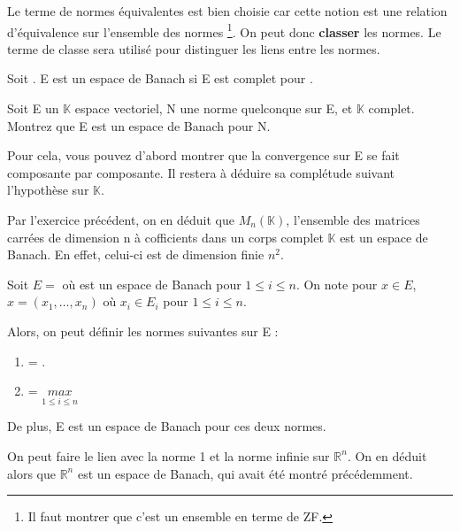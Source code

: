 Le terme de normes équivalentes est bien choisie car cette notion est une
relation d'équivalence sur l'ensemble des normes \footnote{Il faut montrer que
c'est un ensemble en terme de ZF.}.
On peut donc \textbf{classer} les normes. Le terme de classe sera utilisé pour
distinguer les liens entre les normes.

\begin{definition}
	Soit . E est un espace de Banach si E est
	complet pour .
\end{definition}

\begin{exercice}
	Soit E un $\mathbb{K}$ espace vectoriel, N une norme quelconque sur E, et
	$\mathbb{K}$ complet. 
	Montrez que E est un espace de Banach pour N.
	
	Pour cela, vous pouvez d'abord montrer que la convergence sur E se fait
	composante par composante. Il restera à déduire sa complétude suivant
	l'hypothèse sur $\mathbb{K}$.
\end{exercice}

\begin{exemple}
	Par l'exercice précédent, on en déduit que $M_{n}(\mathbb{K})$, l'ensemble
	des matrices carrées de dimension n à cofficients dans un corps complet
	$\mathbb{K}$ est un espace de Banach. En effet, celui-ci est de dimension
	finie $n^{2}$.
\end{exemple}

\begin{proposition}
	Soit $E = $ où 
	est un espace de Banach pour $1 \leq i \leq n$.
	On note pour $x \in E$, $x = (x_{1}, \ldots, x_{n})$ où $x_{i} \in
	E_{i}$ pour $1 \leq i \leq n$.
	
	Alors, on peut définir les normes suivantes sur E :
	\begin{enumerate}
		\item {} = .
		\item {} = $\underset{1 \leq i \leq
			n}{max}$
	\end{enumerate}

	De plus, E est un espace de Banach pour ces deux normes.
\end{proposition}

\begin{exemple}
	On peut faire le lien avec la norme 1 et la norme infinie sur
	$\mathbb{R}^{n}$. On en déduit alors que $\mathbb{R}^{n}$ est un espace de
	Banach, qui avait été montré précédemment.
\end{exemple}

